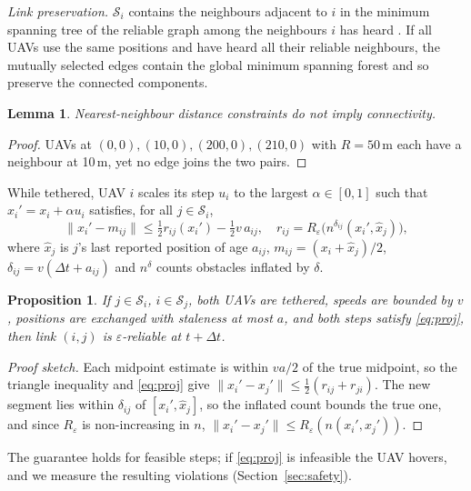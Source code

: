 \documentclass[conference]{IEEEtran}
\newtheorem{lemma}{Lemma}
\newtheorem{proposition}{Proposition}
\begin{document}
\emph{Link preservation.} $\mathcal{S}_i$ contains the neighbours adjacent to $i$ in the minimum
spanning tree of the reliable graph among the neighbours $i$ has heard \cite{li2003lmst}. If all UAVs use the same positions and have heard all
their reliable neighbours, the mutually selected edges contain the global minimum spanning forest and
so preserve the connected components.
\begin{lemma}\label{lem:nn}
Nearest-neighbour distance constraints do not imply connectivity.
\end{lemma}
\begin{proof}
UAVs at $(0,0),(10,0),(200,0),(210,0)$ with $R=50$\,m each have a neighbour at 10\,m, yet no edge joins
the two pairs.
\end{proof}
While tethered, UAV $i$ scales its step $u_i$ to the largest $\alpha\in[0,1]$ such that
$x_i'=x_i+\alpha u_i$ satisfies, for all $j\in\mathcal{S}_i$,
\begin{equation}
\|x_i'-m_{ij}\|\le\tfrac12 r_{ij}(x_i')-\tfrac12 v\,a_{ij},\quad r_{ij}=R_\varepsilon\big(n^{\delta_{ij}}(x_i',\hat x_j)\big),\label{eq:proj}
\end{equation}
where $\hat x_j$ is $j$'s last reported position of age $a_{ij}$, $m_{ij}=(x_i+\hat x_j)/2$,
$\delta_{ij}=v(\Delta t+a_{ij})$ and $n^\delta$ counts obstacles inflated by $\delta$.
\begin{proposition}\label{prop:link}
If $j\in\mathcal{S}_i$, $i\in\mathcal{S}_j$, both UAVs are tethered, speeds are bounded by $v$,
positions are exchanged with staleness at most $a$, and both steps satisfy \eqref{eq:proj}, then link
$(i,j)$ is $\varepsilon$-reliable at $t+\Delta t$.
\end{proposition}
\begin{proof}[Proof sketch]
Each midpoint estimate is within $va/2$ of the true midpoint, so the triangle inequality and
\eqref{eq:proj} give $\|x_i'-x_j'\|\le\frac12(r_{ij}+r_{ji})$. The new segment lies within
$\delta_{ij}$ of $[x_i',\hat x_j]$, so the inflated count bounds the true one, and since $R_\varepsilon$
is non-increasing in $n$, $\|x_i'-x_j'\|\le R_\varepsilon(n(x_i',x_j'))$.
\end{proof}
The guarantee holds for feasible steps; if \eqref{eq:proj} is infeasible the UAV hovers, and we
measure the resulting violations (Section~\ref{sec:safety}).
\end{document}
